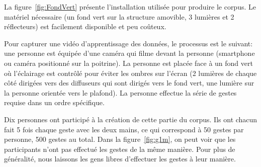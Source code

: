 La figure~\ref{fig:FondVert} présente l'installation utilisée pour produire le corpus. Le matériel nécessaire (un fond vert sur la structure amovible, 3 lumières et 2 réflecteurs) est facilement disponible et peu coûteux.

Pour capturer une vidéo d'apprentissage des données, le processus est le suivant: une personne est équipée d'une caméra qui filme devant la personne (smartphone ou caméra positionné sur la poitrine). La personne est placée face à un fond vert où l'éclairage est contrôlé pour éviter les ombres sur l'écran (2 lumières de chaque côté dirigées vers des diffuseurs qui sont dirigés vers le fond vert, une lumière sur la personne orientée vers le plafond). La personne effectue la série de gestes requise dans un ordre spécifique.




Dix personnes ont participé à la création de cette partie du corpus. Ils ont chacun fait 5 fois chaque geste avec les deux mains, ce qui correspond à 50 gestes par personne, 500 gestes au total. Dans la figure~\ref{fig:g1m}, on peut voir que les participants n'ont pas effectué les gestes de la même manière. Pour plus de généralité, nous laissons les gens libres d'effectuer les gestes à leur manière.



